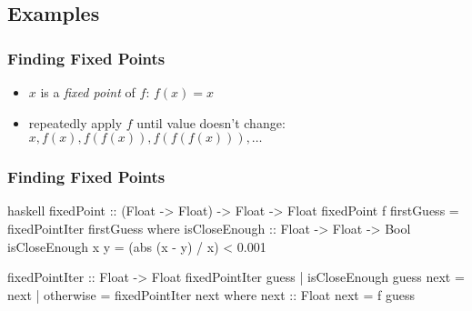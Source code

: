 \documentclass[dvipsnames]{beamer}
\theoremstyle{plain}
\begin{document}
\subsection{Examples}


\begin{frame}
  \frametitle{Finding Fixed Points}

  \begin{itemize}
    \item $x$ is a \emph{fixed point} of $f$: $f(x)=x$
    \item repeatedly apply $f$ until value doesn't change:\\
      $x,f(x),f(f(x)),f(f(f(x))),\ldots$
  \end{itemize}
\end{frame}

\begin{frame}[fragile]
  \frametitle{Finding Fixed Points}

  \begin{exampleblock}{}
    \begin{pygments}{haskell}
fixedPoint :: (Float -> Float) -> Float -> Float
fixedPoint f firstGuess = fixedPointIter firstGuess
  where
    isCloseEnough :: Float -> Float -> Bool
    isCloseEnough x y = (abs (x - y) / x) < 0.001

    fixedPointIter :: Float -> Float
    fixedPointIter guess
      | isCloseEnough guess next = next
      | otherwise                = fixedPointIter next
      where
        next :: Float
        next = f guess
    \end{pygments}
  \end{exampleblock}
\end{frame}
\end{document}
